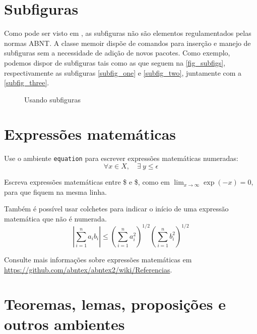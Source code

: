 \section{Subfiguras}

Como pode ser visto em , as subfiguras não 
são elementos regulamentados pelas normas ABNT. A classe \textsf{memoir} dispõe
de comandos para inserção e manejo de subfiguras sem a necessidade de adição de
novos pacotes. Como exemplo, podemos dispor de subfiguras tais como as que seguem
na \autoref{fig_subfigs}, respectivamente as subfiguras \ref{subfig_one} e 
\ref{subfig_two}, juntamente com a \autoref{subfig_three}.
\begin{figure}
  \centering
  \caption{Usando subfiguras}
  \label{fig_subfigs}
\end{figure}

\section{Expressões matemáticas}
\label{math-expr}

Use o ambiente \texttt{equation} para escrever
expressões matemáticas numeradas:
\begin{equation}
  \forall x \in X, \quad \exists \: y \leq \epsilon
\end{equation}

Escreva expressões matemáticas entre \$ e \$, como em $ \lim_{x \to \infty}
\exp(-x) = 0 $, para que fiquem na mesma linha.

Também é possível usar colchetes para indicar o início de uma expressão
matemática que não é numerada.
\[
\left|\sum_{i=1}^n a_ib_i\right|
\le
\left(\sum_{i=1}^n a_i^2\right)^{1/2}
\left(\sum_{i=1}^n b_i^2\right)^{1/2}
\]

Consulte mais informações sobre expressões matemáticas em
\url{https://github.com/abntex/abntex2/wiki/Referencias}.

\section{Teoremas, lemas, proposições e outros ambientes}

